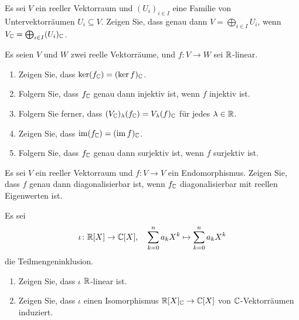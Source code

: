 \documentclass[a4paper,10pt]{article}
\begin{document}


\begin{question}
  Es sei $V$ ein reeller Vektorraum und $(U_i)_{i \in I}$ eine Familie von Untervektorräumen $U_i \subseteq V$.
  Zeigen Sie, dass genau dann $V = \bigoplus_{i \in I} U_i$, wenn $V_{\mathbb{C}} = \bigoplus_{i \in I} (U_i)_{\mathbb{C}}$.
\end{question}


\begin{question}
  Es seien $V$ und $W$ zwei reelle Vektorräume, und $f \colon V \to W$ sei $\mathbb{R}$-linear.
  \begin{enumerate}[leftmargin=*]
    \item
      Zeigen Sie, dass $\ker (f_{\mathbb{C}}) = (\ker f)_{\mathbb{C}}$.
    \item
      Folgern Sie, dass $f_{\mathbb{C}}$ genau dann injektiv ist, wenn $f$ injektiv ist.
    \item
      Folgern Sie ferner, dass $(V_{\mathbb{C}})_\lambda(f_{\mathbb{C}}) = V_\lambda(f)_{\mathbb{C}}$ für jedes $\lambda \in \mathbb{R}$.
    \item
      Zeigen Sie, dass $\operatorname{im} (f_{\mathbb{C}}) = (\operatorname{im} f)_{\mathbb{C}}$.
    \item
      Folgern Sie, dass $f_{\mathbb{C}}$ genau dann surjektiv ist, wenn $f$ surjektiv ist.
  \end{enumerate}
\end{question}


\begin{question}
  Es sei $V$ ein reeller Vektorraum und $f \colon V \to V$ ein Endomorphismus.
  Zeigen Sie, dass $f$ genau dann diagonalisierbar ist, wenn $f_{\mathbb{C}}$ diagonalisierbar mit reellen Eigenwerten ist.
\end{question}


\begin{question}
  Es sei
  \[
    \iota \colon \mathbb{R}[X] \to \mathbb{C}[X],
    \quad
    \sum_{k=0}^n a_k X^k \mapsto \sum_{k=0}^n a_k X^k
  \]
  die Teilmengeninklusion.
  \begin{enumerate}[leftmargin=*]
    \item
      Zeigen Sie, dass $\iota$ $\mathbb{R}$-linear ist.
    \item
      Zeigen Sie, dass $\iota$ einen Isomorphismus $\mathbb{R}[X]_{\mathbb{C}} \to \mathbb{C}[X]$ von $\mathbb{C}$-Vektorräumen induziert.
  \end{enumerate}
\end{question}
\end{document}
